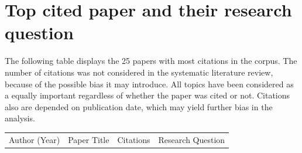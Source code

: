 \section{Top cited paper and their research question}

The following table displays the 25 papers with most citations in the corpus. The number of citations was not considered in the systematic literature review, because of the possible bias it may introduce. All topics have been considered as a equally important regardless of whether the paper was cited or not. Citations also are depended on publication date, which may yield further bias in the analysis. 

{\renewcommand{\arraystretch}{2}

	\small
	\singlespacing
	\begin{longtable}{ 
			p{}%
			p{}%
			p{}%
			p{}%
	 	}
	Author (Year) & Paper Title & Citations & Research Question \\
	

\end{longtable}}
